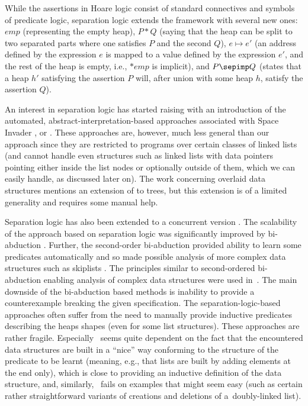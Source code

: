 	  While the assertions in Hoare logic consist of standard connectives and symbols of predicate logic,
	  separation logic extends the framework with several new ones: $emp$ (representing
	  the empty heap), $P*Q$ (saying that the heap can be split to two separated parts where one satisfies $P$ and the second $Q$),
	  $e \mapsto e'$ (an address defined by the expression $e$ is mapped to a value defined
	  by the expression $e'$, and the rest of the heap is empty, i.e., $*emp$ is implicit),
	  and $P\sepimp Q$ (states that a heap $h'$ satisfying the assertion $P$ will, after union with some heap $h$,
	  satisfy the assertion $Q$).

	  An interest in separation logic has started raising with an introduction of the automated,
	  abstract-interpretation-based approaches associated with Space Invader \cite{InvaderCAV08}, or \slayer \cite{slayer11}.
          These approaches are, however, much less general than
          our approach since they are restricted to programs over certain classes of
          linked lists (and cannot handle even structures such as linked lists with data
          pointers pointing either inside the list nodes or optionally outside of them,
          which we can easily handle, as discussed later on). 
          The work \cite{overlaid11} concerning overlaid data
          structures mentions an extension of \spaceinvader to trees, but this extension
          is of a limited generality and requires some manual help.

	  Separation logic has also been extended to a concurrent version \cite{brookes16}.
	  The scalability of the approach based on separation logic was significantly improved by bi-abduction \cite{abduction11}.
	  Further, the second-order bi-abduction provided ability to learn some predicates automatically and so made possible analysis
	  of more complex data structures such as skiplists \cite{locle:secondorder}.
	  The principles similar to second-ordered bi-abduction enabling analysis of complex data structures
	  were used in~\cite{indPrSynt07}.
	  The main downside of the bi-abduction based methods is inability to provide a counterexample breaking
	  the given specification.
	  The separation-logic-based approa\-ches often suffer from the need to manually provide inductive predicates
	  describing the heaps shapes (even for some list structures).
          These approaches are rather fragile. Especially~\cite{indPrSynt07}
          seems quite dependent on the fact that the encountered
          data structures are built in a ``nice'' way conforming to the structure of the
          predicate to be learnt (meaning, e.g., that lists are built by adding elements
          at the end only), which is close to providing an inductive definition of the
          data structure, and, similarly, \cite{locle:secondorder}~fails on examples that
          might seem easy (such as certain rather straightforward variants of creations
          and deletions of a~doubly-linked list).

